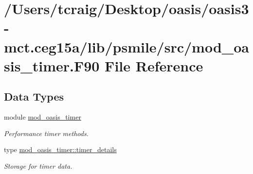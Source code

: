 \hypertarget{mod__oasis__timer_8_f90}{\section{/\+Users/tcraig/\+Desktop/oasis/oasis3-\/mct.ceg15a/lib/psmile/src/mod\+\_\+oasis\+\_\+timer.F90 File Reference}
\label{mod__oasis__timer_8_f90}
}
\subsection*{Data Types}
\begin{DoxyCompactItemize}
\item 
module \hyperlink{classmod__oasis__timer}{mod\+\_\+oasis\+\_\+timer}
\begin{DoxyCompactList}\small\item\em Performance timer methods. \end{DoxyCompactList}\item 
type \hyperlink{structmod__oasis__timer_1_1timer__details}{mod\+\_\+oasis\+\_\+timer\+::timer\+\_\+details}
\begin{DoxyCompactList}\small\item\em Storage for timer data. \end{DoxyCompactList}\end{DoxyCompactItemize}

